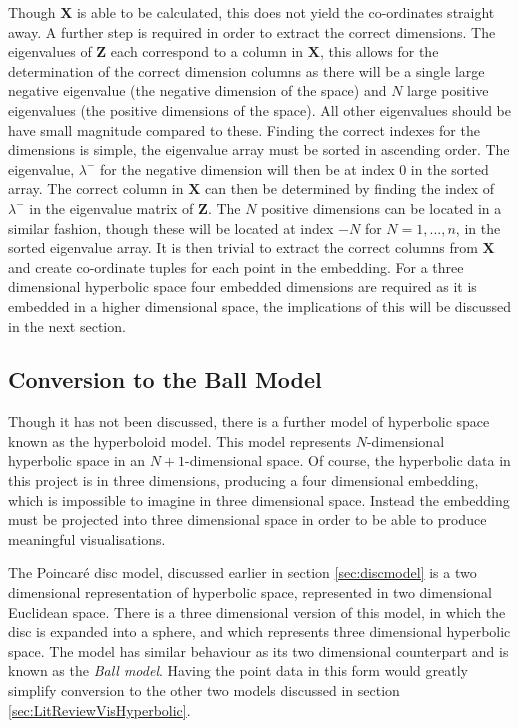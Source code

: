 Though $\boldsymbol{X}$ is able to be calculated, this does not yield the co-ordinates straight away. A further step is required in order to extract the correct dimensions. The eigenvalues of $\boldsymbol{Z}$ each correspond to a column in $\boldsymbol{X}$, this allows for the determination of the correct dimension columns as there will be a single large negative eigenvalue (the negative dimension of the space) and $N$ large positive eigenvalues (the positive dimensions of the space). All other eigenvalues should be have small magnitude compared to these. Finding the correct indexes for the dimensions is simple, the eigenvalue array must be sorted in ascending order. The eigenvalue, $\lambda^-$ for the negative dimension will then be at index 0 in the sorted array. The correct column in $\boldsymbol{X}$ can then be determined by finding the index of $\lambda^-$ in the eigenvalue matrix of $\boldsymbol{Z}$. The $N$ positive dimensions can be located in a similar fashion, though these will be located at index $-N$ for $N=1,...,n$, in the sorted eigenvalue array. It is then trivial to extract the correct columns from $\boldsymbol{X}$ and create co-ordinate tuples for each point in the embedding. For a three dimensional hyperbolic space four embedded dimensions are required as it is embedded in a higher dimensional space, the implications of this will be discussed in the next section.

\subsection{Conversion to the Ball Model}

Though it has not been discussed, there is a further model of hyperbolic space known as the hyperboloid model. This model represents $N$-dimensional hyperbolic space in an $N+1$-dimensional space. Of course, the hyperbolic data in this project is in three dimensions, producing a four dimensional embedding, which is impossible to imagine in three dimensional space. Instead the embedding must be projected into three dimensional space in order to be able to produce meaningful visualisations. 

The Poincar\'{e} disc model, discussed earlier in section \ref{sec:discmodel} is a two dimensional representation of hyperbolic space, represented in two dimensional Euclidean space. There is a three dimensional version of this model, in which the disc is expanded into a sphere, and which represents three dimensional hyperbolic space. The model has similar behaviour as its two dimensional counterpart and is known as the \textit{Ball model}. Having the point data in this form would greatly simplify conversion to the other two models discussed in section \ref{sec:LitReviewVisHyperbolic}. 

